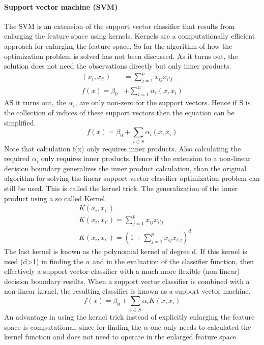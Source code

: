 \documentclass[../document.tex]{subfiles}
\begin{document}
	\paragraph{Support vector machine (SVM)}
	The SVM is an extension of the support vector classifier that results from enlarging the feature space using kernels. Kernels are a computationally efficient approach for enlarging the feature space. So far the algorithm of how the optimization problem is solved has not been discussed. As it turns out, the solution does not need the observations directly but only inner products.
	\begin{equation}
	\begin{split}
		(x_{i},x_{i'})&=\sum_{j=1}^{p}x_{ij}x_{i'j}\\
		f(x)=\beta_{0}&+\sum_{i=1}^{n}\alpha_{i}(x,x_{i})
	\end{split}
	\end{equation}
	AS it turns out, the \(\alpha_{i}\), are only non-zero for the support vectors. Hence if S is the collection of indices of these support vectors then the equation can be simplified.
	\begin{equation}
		f(x)=\beta_{0}+\sum_{i\in S}\alpha_{i}(x,x_{i})
	\end{equation}
	Note that calculation f(x) only requires inner products. Also calculating the required \(\alpha_{i}\) only requires inner products. Hence if the extension to a non-linear decision boundary generalizes the inner product calculation, than the original algorithm for solving the linear support vector classifier optimization problem can still be used. This is called the kernel trick. The generalization of the inner product using a so called Kernel.
	\begin{equation}
	\begin{split}
		&K(x_{i},x_{i'})\\
		&K(x_{i},x_{i'})=\sum_{j=1}^{p}x_{ij}x_{i'j}\\
		&K(x_{i},x_{i'})=(1+\sum_{j=1}^{p}x_{ij}x_{i'j})^d
	\end{split}
	\end{equation}
	The last kernel is known as the polynomial kernel of degree d. If this kernel is used (d>1) in finding the \(\alpha\) and in the evaluation of the classifier function, then effectively a support vector classifier with a much more flexible (non-linear) decision boundary results. When a support vector classifier is combined with a non-linear kernel, the resulting classifier is known as a support vector machine.
	\begin{equation}
		f(x)=\beta_{0}+\sum_{i\in S}\alpha_{i}K(x,x_{i})
	\end{equation}
	An advantage in using the kernel trick instead of explicitly enlarging the feature space is computational, since for finding the \(\alpha\) one only needs to calculated the kernel function and does not need to operate in the enlarged feature space.
\end{document}
